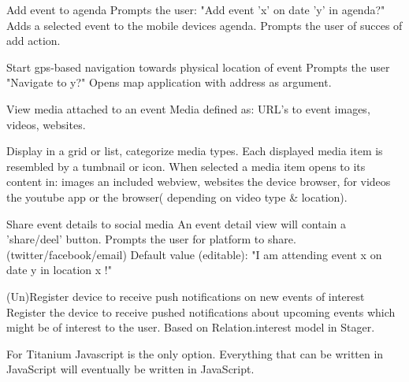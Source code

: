 Add event to agenda
Prompts the user: "Add event 'x' on date 'y' in agenda?"
Adds a selected event to the mobile devices agenda.
Prompts the user of succes of add action.

Start gps-based navigation towards physical location of event
Prompts the user "Navigate to y?"
Opens map application with address as argument.

View media attached to an event
Media defined as: URL's to event images, videos, websites.

Display in a grid or list, categorize media types.
Each displayed media item is resembled by a tumbnail or icon.
When selected a media item opens to its content in:
images an included webview,
websites the device browser,
for videos the youtube app or the browser( depending on video type \& location).

Share event details to social media
An event detail view will contain a 'share/deel' button.
Prompts the user for platform to share. (twitter/facebook/email)
Default value (editable): "I am attending event x on date y in location x !"

	
(Un)Register device to receive push notifications on new events of interest
Register the device to receive pushed notifications about upcoming events which might be of interest to the user.
Based on Relation.interest model in Stager.






For Titanium Javascript is the only option. Everything that can be written in JavaScript will eventually be written in JavaScript.


